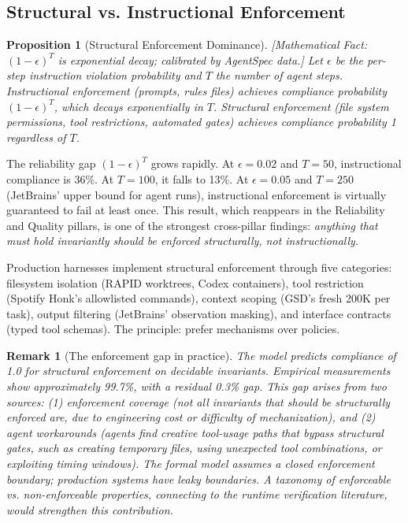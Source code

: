 \documentclass[11pt, a4paper]{googledeepmind}
\newtheorem{proposition}{Proposition}[section]
\newtheorem*{remark}{Remark}
\begin{document}
\subsection{Structural vs. Instructional Enforcement}

\begin{proposition}[Structural Enforcement Dominance]
\emph{[Mathematical Fact: $(1-\epsilon)^T$ is exponential decay; calibrated by AgentSpec data.]}
\label{prop:enforcement}
Let $\epsilon$ be the per-step instruction violation probability and $T$ the number of agent steps. Instructional enforcement (prompts, rules files) achieves compliance probability $(1-\epsilon)^T$, which decays exponentially in $T$. Structural enforcement (file system permissions, tool restrictions, automated gates) achieves compliance probability 1 regardless of $T$.
\end{proposition}

The reliability gap $(1-\epsilon)^T$ grows rapidly. At $\epsilon = 0.02$ and $T = 50$, instructional compliance is 36\%. At $T = 100$, it falls to 13\%. At $\epsilon = 0.05$ and $T = 250$ (JetBrains' upper bound for agent runs), instructional enforcement is virtually guaranteed to fail at least once. This result, which reappears in the Reliability and Quality pillars, is one of the strongest cross-pillar findings: \emph{anything that must hold invariantly should be enforced structurally, not instructionally.}

Production harnesses implement structural enforcement through five categories: filesystem isolation (RAPID worktrees, Codex containers), tool restriction (Spotify Honk's allowlisted commands), context scoping (GSD's fresh 200K per task), output filtering (JetBrains' observation masking), and interface contracts (typed tool schemas). The principle: prefer mechanisms over policies.

\begin{remark}[The enforcement gap in practice]
The model predicts compliance of 1.0 for structural enforcement on decidable invariants. Empirical measurements show approximately 99.7\%, with a residual 0.3\% gap. This gap arises from two sources: (1) enforcement coverage (not all invariants that should be structurally enforced are, due to engineering cost or difficulty of mechanization), and (2) agent workarounds (agents find creative tool-usage paths that bypass structural gates, such as creating temporary files, using unexpected tool combinations, or exploiting timing windows). The formal model assumes a closed enforcement boundary; production systems have leaky boundaries. A taxonomy of enforceable vs. non-enforceable properties, connecting to the runtime verification literature, would strengthen this contribution.
\end{remark}
\end{document}
